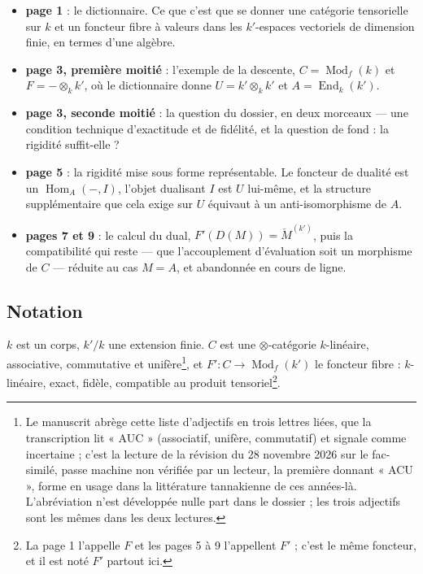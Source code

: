 \documentclass[11pt,a4paper]{article}
\begin{document}
\begin{itemize}
\item \textbf{page 1} : le dictionnaire. Ce que c'est que se donner une
catégorie tensorielle sur $k$ et un foncteur fibre à valeurs dans les
$k'$-espaces vectoriels de dimension finie, en termes d'une algèbre.
\item \textbf{page 3, première moitié} : l'exemple de la descente,
$C = \operatorname{Mod}_{f}(k)$ et $F = -\otimes_{k} k'$, où le dictionnaire
donne $U = k' \otimes_{k} k'$ et $A = \operatorname{End}_{k}(k')$.
\item \textbf{page 3, seconde moitié} : la question du dossier, en deux
morceaux — une condition technique d'exactitude et de fidélité, et la question
de fond : la rigidité suffit-elle ?
\item \textbf{page 5} : la rigidité mise sous forme représentable. Le foncteur
de dualité est un $\operatorname{Hom}_{A}(-, I)$, l'objet dualisant $I$ est
$U$ lui-même, et la structure supplémentaire que cela exige sur $U$ équivaut à
un anti-isomorphisme de $A$.
\item \textbf{pages 7 et 9} : le calcul du dual, $F'(D(M)) = \check{M}^{(k')}$,
puis la compatibilité qui reste — que l'accouplement d'évaluation soit un
morphisme de $C$ — réduite au cas $M = A$, et abandonnée en cours de ligne.
\end{itemize}

\subsection*{Notation}

$k$ est un corps, $k'/k$ une extension finie. $C$ est une $\otimes$-catégorie
$k$-linéaire, associative, commutative et unifère\footnote{Le manuscrit abrège
cette liste d'adjectifs en trois lettres liées, que la transcription lit
« AUC » (associatif, unifère, commutatif) et signale comme incertaine ; c'est
la lecture de la révision du 28 novembre 2026 sur le fac-similé, passe machine non vérifiée par un lecteur,
la première donnant « ACU », forme en usage dans la littérature tannakienne de
ces années-là. L'abréviation n'est développée nulle part dans le dossier ; les
trois adjectifs sont les mêmes dans les deux lectures.}, et $F' : C \to
\operatorname{Mod}_{f}(k')$ le foncteur fibre : $k$-linéaire, exact, fidèle,
compatible au produit tensoriel\footnote{La page 1 l'appelle $F$ et les pages 5
à 9 l'appellent $F'$ ; c'est le même foncteur, et il est noté $F'$ partout
ici.}.
\end{document}
